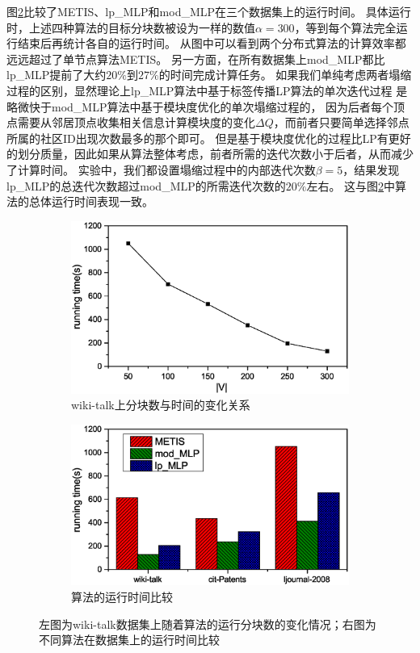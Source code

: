 \documentclass[master]{njuthesis}
\begin{document}
图\ref{fig:partition_time}比较了METIS、lp\string_MLP和mod\string_MLP在三个数据集上的运行时间。
具体运行时，上述四种算法的目标分块数被设为一样的数值$\alpha=300$，等到每个算法完全运行结束后再统计各自的运行时间。
从图中可以看到两个分布式算法的计算效率都远远超过了单节点算法METIS。
另一方面，在所有数据集上mod\string_MLP都比lp\string_MLP提前了大约$20\%$到$27\%$的时间完成计算任务。
如果我们单纯考虑两者塌缩过程的区别，显然理论上lp\string_MLP算法中基于标签传播LP算法的单次迭代过程
是略微快于mod\string_MLP算法中基于模块度优化的单次塌缩过程的，
因为后者每个顶点需要从邻居顶点收集相关信息计算模块度的变化$\Delta Q$，而前者只要简单选择邻点所属的社区ID出现次数最多的那个即可。
但是基于模块度优化的过程比LP有更好的划分质量，因此如果从算法整体考虑，前者所需的迭代次数小于后者，从而减少了计算时间。
实验中，我们都设置塌缩过程中的内部迭代次数$\beta=5$，结果发现lp\string_MLP的总迭代次数超过mod\string_MLP的所需迭代次数的$20\%$左右。
这与图\ref{fig:partition_time}中算法的总体运行时间表现一致。

\begin{figure}[t]
\centering
\begin{subfigure}[b]{0.48\textwidth}
	\center
	\includegraphics[width=1\textwidth]{figure/block_time.eps}
	\caption{wiki-talk上分块数与时间的变化关系}
	\label{fig:block_with_time}
\end{subfigure}
\begin{subfigure}[b]{0.48\textwidth}
	\centering
	\includegraphics[width=1\textwidth]{figure/running_ti.eps}
	\caption{算法的运行时间比较}
	\label{fig:partition_time}
\end{subfigure}
\label{fig:running_cond}
\caption{左图为wiki-talk数据集上随着算法的运行分块数的变化情况；右图为不同算法在数据集上的运行时间比较}
\end{figure}
\end{document}
